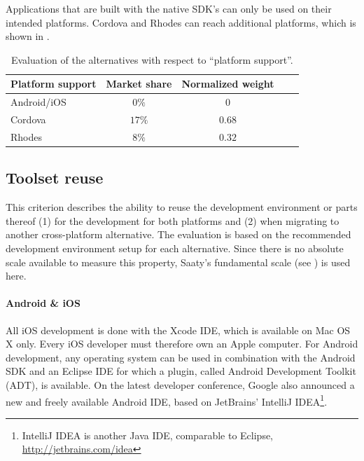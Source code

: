 Applications that are built with the native SDK's can only be used on their intended platforms. Cordova and Rhodes can reach additional platforms, which is shown in . 

\begin{table}[h!]
    \centering
    \begin{tabular}{lcccl}
        \hline
        \textbf{Platform support} & Market share & Normalized weight \\
        \hline
        Android/iOS               & $0\%$        & $0$               \\
        Cordova                   & $17\%$       & $0.68$            \\
        Rhodes                    & $8\%$        & $0.32$            \\
        \hline
    \end{tabular}
    \caption{Evaluation of the alternatives with respect to ``platform support''.}
    \label{tab:ps}
\end{table}

\subsection{Toolset reuse}

This criterion describes the ability to reuse the development environment or parts thereof (1) for the development for both platforms and (2) when migrating to another cross-platform alternative. The evaluation is based on the recommended development environment setup for each alternative. Since there is no absolute scale available to measure this property, Saaty's fundamental scale (see ) is used here.

\paragraph{Android \& iOS} All iOS development is done with the Xcode IDE, which is available on Mac OS X only. Every iOS developer must therefore own an Apple computer. For Android development, any operating system can be used in combination with the Android SDK and an Eclipse IDE for which a plugin, called Android Development Toolkit (ADT), is available. On the latest developer conference, Google also announced a new and freely available Android IDE, based on JetBrains' IntelliJ IDEA\footnote{IntelliJ IDEA is another Java IDE, comparable to Eclipse, \url{http://jetbrains.com/idea}}.

